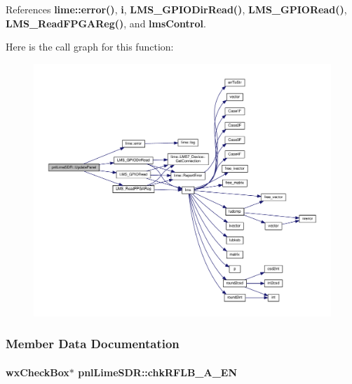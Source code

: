 References {\bf lime\+::error()}, {\bf i}, {\bf L\+M\+S\+\_\+\+G\+P\+I\+O\+Dir\+Read()}, {\bf L\+M\+S\+\_\+\+G\+P\+I\+O\+Read()}, {\bf L\+M\+S\+\_\+\+Read\+F\+P\+G\+A\+Reg()}, and {\bf lms\+Control}.



Here is the call graph for this function\+:
\nopagebreak
\begin{figure}[H]
\begin{center}
\leavevmode
\includegraphics[width=350pt]{de/d23/classpnlLimeSDR_a8fdc642f12b1ef2cb005d1c144f26f6b_cgraph}
\end{center}
\end{figure}




\subsubsection{Member Data Documentation}
\paragraph[{chk\+R\+F\+L\+B\+\_\+\+A\+\_\+\+EN}]{\setlength{\rightskip}{0pt plus 5cm}wx\+Check\+Box$\ast$ pnl\+Lime\+S\+D\+R\+::chk\+R\+F\+L\+B\+\_\+\+A\+\_\+\+EN\hspace{0.3cm}{\ttfamily [protected]}}\label{classpnlLimeSDR_a1950ddc0c87297371140ffb98d66f33a}


